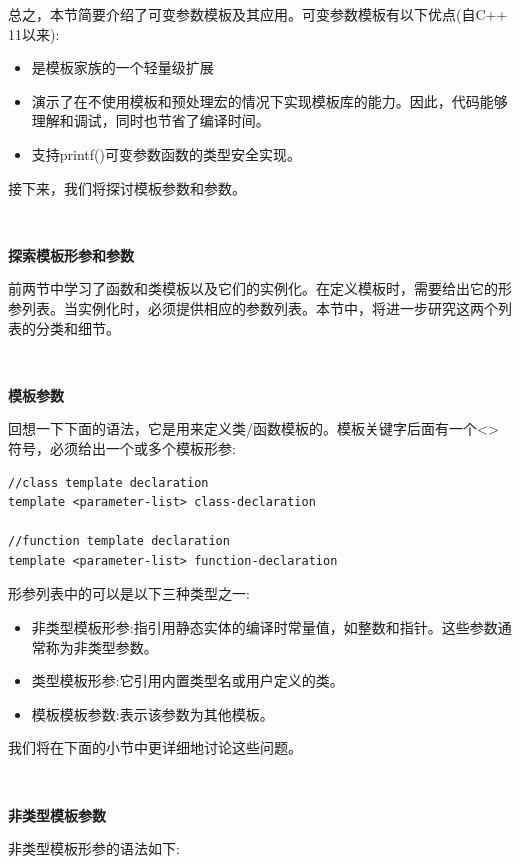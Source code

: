 总之，本节简要介绍了可变参数模板及其应用。可变参数模板有以下优点(自C++ 11以来): \par

\begin{itemize}
	\item 是模板家族的一个轻量级扩展
	\item 演示了在不使用模板和预处理宏的情况下实现模板库的能力。因此，代码能够理解和调试，同时也节省了编译时间。
	\item 支持printf()可变参数函数的类型安全实现。
\end{itemize}

接下来，我们将探讨模板参数和参数。\par

\noindent\textbf{}\ \par
\textbf{探索模板形参和参数} \ \par
前两节中学习了函数和类模板以及它们的实例化。在定义模板时，需要给出它的形参列表。当实例化时，必须提供相应的参数列表。本节中，将进一步研究这两个列表的分类和细节。 \par

\noindent\textbf{}\ \par
\textbf{模板参数} \ \par
回想一下下面的语法，它是用来定义类/函数模板的。模板关键字后面有一个<>符号，必须给出一个或多个模板形参: \par

\begin{lstlisting}[caption={}]
//class template declaration
template <parameter-list> class-declaration

//function template declaration
template <parameter-list> function-declaration
\end{lstlisting}

形参列表中的可以是以下三种类型之一: \par

\begin{itemize}
	\item 非类型模板形参:指引用静态实体的编译时常量值，如整数和指针。这些参数通常称为非类型参数。 
	\item 类型模板形参:它引用内置类型名或用户定义的类。
	\item 模板模板参数:表示该参数为其他模板。
\end{itemize}

我们将在下面的小节中更详细地讨论这些问题。 \par

\noindent\textbf{}\ \par
\textbf{非类型模板参数} \ \par
非类型模板形参的语法如下: \par

